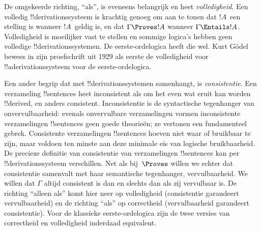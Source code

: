 \documentclass[openany]{memoir}
\begin{document}
De omgekeerde richting, ``als'', is eveneens belangrijk en heet
\emph{volledigheid}. Een volledig !!{derivation}ssysteem is krachtig
genoeg om aan te tonen dat $!A$~een stelling is wanneer $!A$~geldig is,
en dat $\Gamma \Proves !A$ wanneer $\Gamma \Entails !A$.
Volledigheid is moeilijker vast te stellen en sommige logica's hebben
geen volledige !!{derivation}ssystemen. De eerste-ordelogica heeft die
wel. Kurt G\"odel bewees in zijn proefschrift uit 1929 als eerste de
volledigheid voor !!a{derivation}ssysteem voor de eerste-ordelogica.

Een ander begrip dat met !!{derivation}ssystemen samenhangt, is
\emph{consistentie}. Een verzameling !!{sentence}s heet inconsistent
als om het even wat eruit kan worden !!{derive}d, en anders consistent.
Inconsistentie is de syntactische tegenhanger van onvervulbaarheid:
evenals onvervulbare verzamelingen vormen inconsistente verzamelingen
!!{sentence}s geen goede theorieën; ze vertonen een fundamenteel
gebrek. Consistente verzamelingen !!{sentence}s hoeven niet waar of
bruikbaar te zijn, maar voldoen ten minste aan deze minimale eis van
logische bruikbaarheid. De precieze definitie van consistentie van
verzamelingen !!{sentence}s kan per !!{derivation}ssysteem verschillen.
Net als bij~$\Proves$ willen we echter dat consistentie samenvalt met
haar semantische tegenhanger, vervulbaarheid. We willen dat $\Gamma$
altijd consistent is dan en slechts dan als zij vervulbaar is. De
richting ``alleen als'' komt hier neer op volledigheid (consistentie
garandeert vervulbaarheid) en de richting ``als'' op correctheid
(vervulbaarheid garandeert consistentie). Voor de klassieke
eerste-ordelogica zijn de twee versies van correctheid en volledigheid
inderdaad equivalent.
\endgroup

\begingroup
\def\olfilename{OLP-0065}
\def\olfilepath{content/first-order-logic/proof-systems/}
\hypertarget{unit-OLP-0065}{}



      {}
      {}
\end{document}
